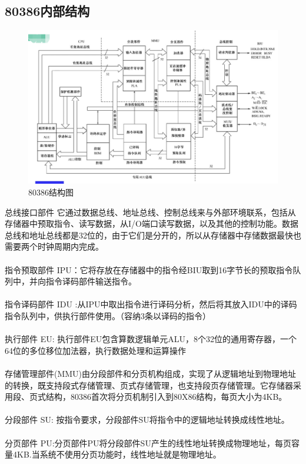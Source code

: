 \documentclass[12pt]{article}
\begin{document}
\subsection{80386内部结构}
\begin{figure}[htbp]
\centering
\includegraphics[scale=0.3]{fig/22.png}
\caption{80386结构图}
\label{fig:80386 component}
\end{figure}
总线接口部件  它通过数据总线、地址总线、控制总线来与外部环境联系，包括从存储器中预取指令、读写数据，从I/O端口读写数据，以及其他的控制功能。数据总线和地址总线都是32位的，由于它们是分开的，所以从存储器中存储数据最快也需要两个时钟周期内完成。\\\\
指令预取部件   IPU：它将存放在存储器中的指令经BIU取到16字节长的预取指令队列中，并向指令译码部件输送指令。\\\\
指令译码部件   IDU :从IPU中取出指令进行译码分析，然后将其放入IDU中的译码指令队列中，供执行部件使用。（容纳3条以译码的指令）\\\\
执行部件  EU: 执行部件EU包含算数逻辑单元ALU，8个32位的通用寄存器，一个64位的多位移位加法器，执行数据处理和运算操作\\\\
存储管理部件(MMU)由分段部件和分页机构组成，实现了从逻辑地址到物理地址的转换，既支持段式存储管理、页式存储管理，也支持段页存储管理。它存储器采用段、页式结构，80386首次将分页机制引入到80X86结构，每页大小为4KB。\\\\
分段部件  SU: 按指令要求，分段部件SU将指令中的逻辑地址转换成线性地址。\\\\
分页部件  PU:分页部件PU将分段部件SU产生的线性地址转换成物理地址，每页容量4KB.当系统不使用分页功能时，线性地址就是物理地址。
\end{document}
